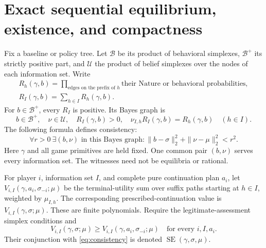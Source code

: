 \documentclass[11pt,a4paper]{article}
\numberwithin{equation}{section}
\theoremstyle{definition}
\DeclareMathOperator{\SE}{SE}
\begin{document}
\section{Exact sequential equilibrium, existence, and compactness}
\label{sec:se}
Fix a baseline or policy tree. Let \(\mathcal B\) be its product of
behavioral simplexes, \(\mathcal B^+\) its strictly positive part,
and \(\mathcal U\) the product of belief simplexes over the nodes of
each information set. Write
\[
 \begin{gathered}
 R_h(\gamma,b)=\prod_{\text{edges on the prefix of }h}
                     \text{their Nature or behavioral probabilities},\\
 R_I(\gamma,b)=\sum_{h\in I}R_h(\gamma,b).
 \end{gathered}
\]
For \(b\in\mathcal B^+\), every \(R_I\) is positive. Its Bayes graph is
\[
 b\in\mathcal B^+,\quad \nu\in\mathcal U,\quad
 R_I(\gamma,b)>0,\quad
 \nu_{I,h}R_I(\gamma,b)=R_h(\gamma,b)\quad(h\in I).
\]
The following formula defines consistency:
\begin{equation}\label{eq:consistency}
 \forall r>0\ \exists(b,\nu)\text{ in this Bayes graph}:
       \|b-\sigma\|_2^2+\|\nu-\mu\|_2^2<r^2 .
\end{equation}
Here \(\gamma\) and all game primitives are held fixed.
One common pair \((b,\nu)\) serves every information set.
The witnesses need not be equilibria or rational.

For player \(i\), information set \(I\), and complete pure continuation
plan \(a_i\), let \(V_{i,I}(\gamma,a_i,\sigma_{-i};\mu)\) be the
terminal-utility sum over suffix paths starting at \(h\in I\), weighted
by \(\mu_{I,h}\). The corresponding prescribed-continuation value is
\(V_{i,I}(\gamma,\sigma;\mu)\). These are finite polynomials.
Require the legitimate-assessment simplex conditions and
\begin{equation}\label{eq:sr}
 V_{i,I}(\gamma,\sigma;\mu)\ge
 V_{i,I}(\gamma,a_i,\sigma_{-i};\mu)
       \quad\text{for every }i,I,a_i .
\end{equation}
Their conjunction with \eqref{eq:consistency} is denoted
\(\SE(\gamma,\sigma,\mu)\).
\end{document}
